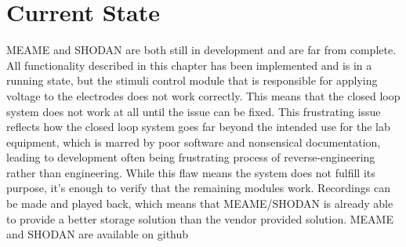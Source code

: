 \section{Current State}
MEAME and SHODAN are both still in development and are far from complete.
All functionality described in this chapter has been implemented and is in a
running state, but the stimuli control module that is responsible for applying
voltage to the electrodes does not work correctly.
This means that the closed loop system does not work at all until the issue can
be fixed.
This frustrating issue reflects how the closed loop system goes far beyond the
intended use for the lab equipment, which is marred by poor software and
nonsensical documentation, leading to development often being frustrating process of
reverse-engineering rather than engineering.
While this flaw means the system does not fulfill its purpose, it's enough to
verify that the remaining modules work.
Recordings can be made and played back, which means that MEAME/SHODAN is already
able to provide a better storage solution than the vendor provided solution.
MEAME and SHODAN are available on github
\cite{MEAME_github}\cite{SHODAN_github}\cite{MEAME_DSP_github}

